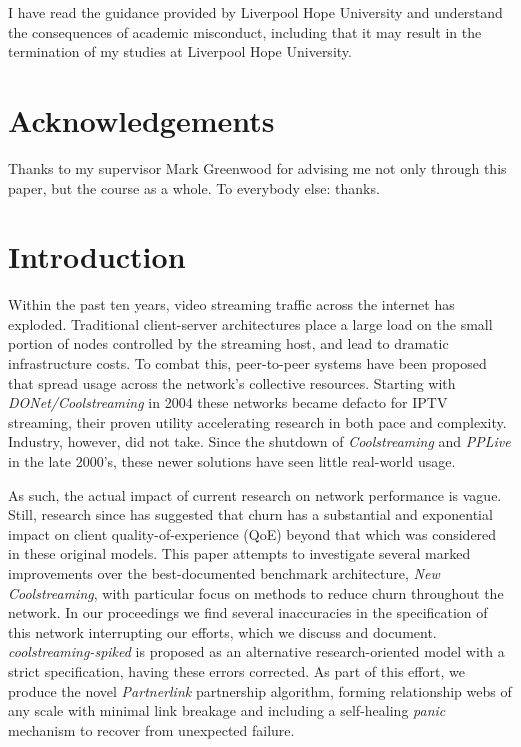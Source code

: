 \documentclass[12pt,a4paper]{article}
\begin{document}
I have read the guidance provided by Liverpool Hope University and understand the consequences of academic misconduct, including that it may result in the termination of my studies at Liverpool Hope University.

\section{Acknowledgements}
Thanks to my supervisor Mark Greenwood for advising me not only through this paper, but the course as a whole. To everybody else: thanks.

\newpage
\tableofcontents
\listoffigures
\listoftables
\printacronyms[display=all]
\newpage

\section{Introduction} \label{introduction}
Within the past ten years, video streaming traffic across the internet has exploded. Traditional client-server architectures place a large load on the small portion of nodes controlled by the streaming host, and lead to dramatic infrastructure costs. To combat this, peer-to-peer systems have been proposed that spread usage across the network's collective resources. Starting with \textit{DONet/Coolstreaming} in 2004 these networks became defacto for IPTV streaming, their proven utility accelerating research in both pace and complexity. Industry, however, did not take. Since the shutdown of \textit{Coolstreaming} and \textit{PPLive} in the late 2000's, these newer solutions have seen little real-world usage.

As such, the actual impact of current research on network performance is vague. Still, research since has suggested that churn has a substantial and exponential impact on client quality-of-experience (QoE) beyond that which was considered in these original models. This paper attempts to investigate several marked improvements over the best-documented benchmark architecture, \textit{New Coolstreaming}, with particular focus on methods to reduce churn throughout the network. In our proceedings we find several inaccuracies in the specification of this network interrupting our efforts, which we discuss and document. \textit{coolstreaming-spiked} is proposed as an alternative research-oriented model with a strict specification, having these errors corrected. As part of this effort, we produce the novel \textit{Partnerlink} partnership algorithm, forming relationship webs of any scale with minimal link breakage and including a self-healing \textit{panic} mechanism to recover from unexpected failure.
\end{document}
